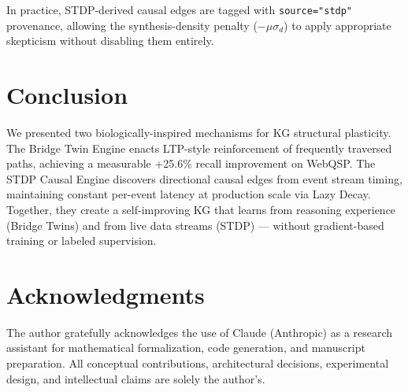 \documentclass[10pt,twocolumn]{article}
\begin{document}
In practice, STDP-derived causal edges are tagged with \texttt{source="stdp"} provenance,
allowing the \CSA{} synthesis-density penalty ($-\mu\sigma_d$) to apply appropriate
skepticism without disabling them entirely.

\section{Conclusion}
\label{sec:conclusion}

We presented two biologically-inspired mechanisms for KG structural plasticity. The
Bridge Twin Engine enacts LTP-style reinforcement of frequently traversed paths,
achieving a measurable +25.6\% recall improvement on WebQSP. The STDP Causal Engine
discovers directional causal edges from event stream timing, maintaining constant
per-event latency at production scale via Lazy Decay. Together, they create a
self-improving KG that learns from reasoning experience (Bridge Twins) and from live
data streams (STDP) — without gradient-based training or labeled supervision.

\section*{Acknowledgments}
The author gratefully acknowledges the use of Claude (Anthropic) as a research assistant
for mathematical formalization, code generation, and manuscript preparation. All
conceptual contributions, architectural decisions, experimental design, and intellectual
claims are solely the author's.
\end{document}
